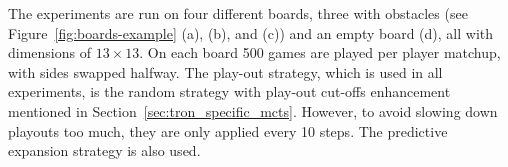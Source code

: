 \documentclass{article}
\begin{document}
The experiments are run on four different boards, three with obstacles (see Figure~\ref{fig:boards-example} (a), (b), and (c)) and an empty board (d), all with dimensions of $13 \times 13$. On each board 500 games are played per player matchup, with sides swapped halfway. %
The play-out strategy, which is used in all experiments, is the random strategy with play-out cut-offs enhancement mentioned in Section~\ref{sec:tron_specific_mcts}. 
However, to avoid slowing down playouts too much, they are only applied every 10 steps. 
The predictive expansion strategy is also used.

\end{document}

